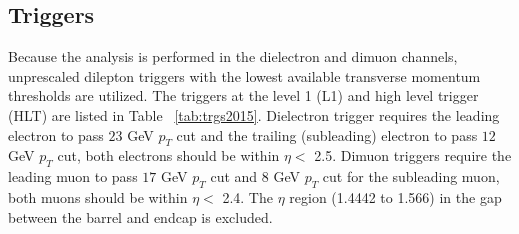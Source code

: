 \subsection{Triggers\label{sec:triggers}}

Because the analysis is performed in the dielectron and dimuon channels, unprescaled dilepton
triggers with the lowest available transverse momentum thresholds are utilized. The triggers at the level 1 (L1) and high level trigger (HLT) are listed in Table ~\ref{tab:trgs2015}. Dielectron trigger requires the leading electron to pass $23$ GeV $p_{T}$ cut and the trailing (subleading) electron to pass $12$ GeV $p_{T}$ cut, both electrons should be within $\eta < $ 2.5. Dimuon triggers require the leading muon to pass $17$ GeV $p_{T}$ cut and $8$ GeV $p_{T}$ cut for the subleading muon, both muons should be within $\eta < $  2.4. The $\eta$ region (1.4442 to 1.566) in the gap between the barrel and endcap is excluded.



